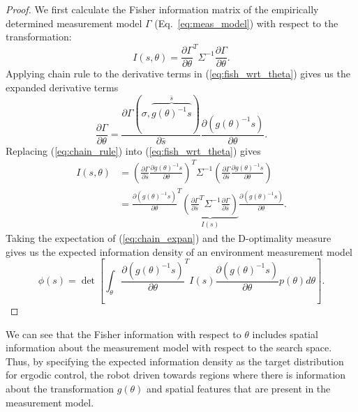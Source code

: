 \documentclass[conference]{IEEEtran}
\begin{document}
\begin{proof}
We first calculate the Fisher information matrix of the empirically determined measurement model $\Gamma$ (Eq.~\ref{eq:meas_model}) with respect to the transformation:
\begin{equation} \label{eq:fish_wrt_theta}
I(s,\theta) = \frac{\partial \Gamma}{\partial \theta}^T \Sigma^{-1} \frac{\partial \Gamma}{\partial \theta}.
\end{equation}
Applying chain rule to the derivative terms in (\ref{eq:fish_wrt_theta}) gives us the expanded derivative terms
\begin{equation} \label{eq:chain_rule}
\frac{\partial \Gamma}{\partial \theta} = \frac{\partial \Gamma(\sigma, \overbrace{g(\theta)^{-1} s}^{\bar{s}} )}{\partial \bar{s}}\frac{\partial \left( g(\theta)^{-1} s \right)}{\partial \theta}.
\end{equation}
Replacing (\ref{eq:chain_rule}) into (\ref{eq:fish_wrt_theta}) gives
\begin{align}\label{eq:chain_expan}
I(s,\theta) &= \left( \frac{\partial \Gamma}{\partial \bar{s}}\frac{\partial g(\theta)^{-1} s}{\partial \theta} \right)^T \Sigma^{-1} \left(  \frac{\partial \Gamma}{\partial \bar{s}}\frac{\partial g(\theta)^{-1} s}{\partial \theta}\right) \\
& = \frac{\partial \left( g(\theta)^{-1} s \right) }{\partial \theta}^T \underbrace{ \left( \frac{\partial \Gamma}{\partial \bar{s}}^T \Sigma^{-1} \frac{\partial \Gamma}{\partial \bar{s}} \right) }_{I(s)} \frac{\partial \left( g(\theta)^{-1} s \right)}{\partial \theta} \nonumber.
\end{align}
Taking the expectation of (\ref{eq:chain_expan}) and the D-optimality measure~\cite{john1975d,fedorov2010optimal} gives us the expected information density of an environment measurement model
\begin{equation*}
\phi(s) = \det \left[ \int_\theta  \frac{\partial \left( g(\theta)^{-1} s \right) }{\partial \theta}^T I(s) \frac{\partial \left( g(\theta)^{-1} s \right)}{\partial \theta} p(\theta) d\theta \right].
\end{equation*}
\end{proof}

We can see that the Fisher information with respect to $\theta$ includes spatial information about the measurement model with respect to the search space. 
Thus, by specifying the expected information density as the target distribution for ergodic control, the robot driven towards regions where there is information about the transformation $g(\theta)$ and spatial features that are present in the measurement model.
\end{document}
